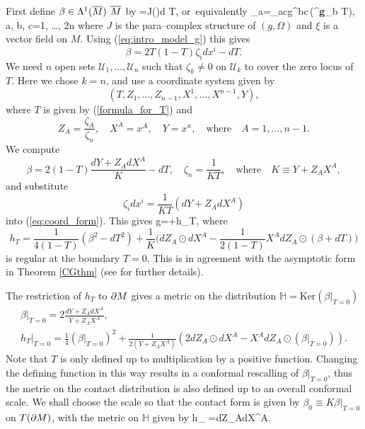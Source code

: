 First define $\beta\in \Lambda^1(\overline{M})$ $\overline{M}$
by 
\be
\label{def_theta}
\xi\hook \beta=J(\xi)\hook d T, \quad\mbox{or equivalently}\quad 
\beta_a=\Omega_{ac}g^{bc}\,({{^{\bf g}\nabla}}_b T), \quad a, b, c=1, \dots, 2n
\ee
where $J$ is the para--complex structure of $(g,  \Omega)$ and $\xi$ is a vector field on $M$. Using (\ref{eq:intro_model_g}) this  gives
\[
\beta=2T(1-T)\zeta_id x^i-dT.
\]
We need $n$  open sets $\mathcal{U}_1, \dots, \mathcal{U}_n$ such that $\zeta_k\neq 0$ on $\mathcal{U}_k$
to cover the zero locus of $T$. Here we chose $k=n$, and use
a coordinate system given by
\[
(T, Z_1, \dots, Z_{n-1}, X^1, \dots,
 X^{n-1}, Y),
\] 
where $T$ is
given by (\ref{formula_for_T}) and
\[
Z_A=\frac {\zeta_A}{\zeta_n}, \quad X^A=x^A, \quad Y=x^{n}, \quad\mbox{where}\quad
A=1, \dots, n-1.
\]
We compute
\[
\beta=2(1-T)\frac{dY+Z_AdX^A}{K}-dT, \quad
\zeta_n=\frac{1}{KT}, \quad \mbox{where}\quad K\equiv Y+Z_AX^A,
\]
and substitute
\[
\zeta_i dx^i=\frac{1}{KT}(dY+Z_AdX^A)
\]
into (\ref{eq:coord_form}). This gives
\be
\label{CG_Form}
g=+h_T,
\ee
where 
\[
h_T=\frac{1}{4(1-T)}(\beta^2-dT^2)+\frac{1}{K}\Big(dZ_A\odot dX^A-\frac{1}{2(1-T)}X^A dZ_A\odot(\beta+dT)\Big)
\]
is regular at the boundary $T=0$. This is in agreement with the 
asymptotic form in Theorem \ref{CGthm} (see \cite{CG} for further details).

The restriction of $h_T$ to $\partial M$ gives a metric on the distribution ${ \mathbb{H} }=\mbox{Ker} (\beta|_{T=0})$
\begin{gather}
\beta|_{T=0}=2\frac{dY+Z_A dX^A}{Y+Z_AX^A}, \nonumber \\
h_T|_{T=0}=\frac{1}{4}{(\beta|_{T=0})}^2+\frac{1}{2(Y+Z_AX^A)}(2dZ_A\odot dX^A-X^AdZ_A\odot(\beta|_{T=0})). \label{h000}
\end{gather}
 Note that $T$ is only defined up to multiplication by a positive function. Changing the defining function in this way results in a conformal rescalling of $\beta|_{T=0}$, thus the metric on the contact distribution is also defined up to an overall conformal scale. We shall choose the scale so that
the contact form is given  by $\beta_0\equiv K\beta|_{T=0}$ on $T(\partial M)$,
with the metric on ${ \mathbb{H} }$ given by
\be
\label{on_distri}
h_{  }=dZ_A\odot dX^A.
\ee

